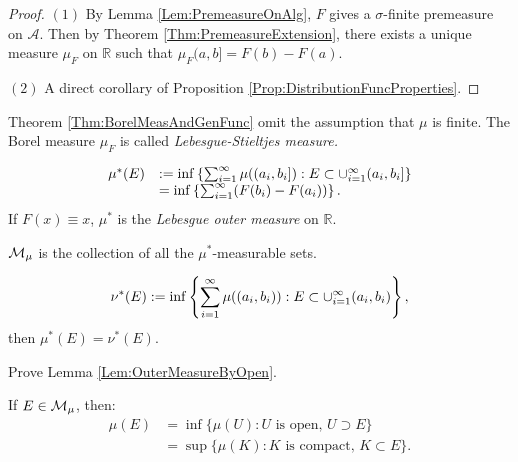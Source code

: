 \begin{proof}
    $(1)$ By Lemma \ref{Lem:PremeasureOnAlg}, $F$ gives a 
    $\sigma$-finite premeasure on $\mathcal{A}$. 
    Then by Theorem \ref{Thm:PremeasureExtension}, there exists a 
    unique measure $\mu_{F}$ on $\mathbb{R}$ such that 
    $\mu_{F}(a,b]=F(b)-F(a)$.

    $(2)$ A direct corollary of Proposition 
    \ref{Prop:DistributionFuncProperties}.
\end{proof}
\begin{rem}
    Theorem \ref{Thm:BorelMeasAndGenFunc} 
    omit the assumption that $\mu$ is finite. 
    The Borel measure $\mu_{F}$ is called 
    \textit{Lebesgue-Stieltjes measure.} 
\end{rem}
\begin{rem}
    \begin{displaymath}
        \begin{array}{rl}
            \mu^{*}(E)&:=\inf\left\{\sum_{i=1}^{\infty}\mu((a_i,b_i]):
            E\subset\cup_{i=1}^{\infty}(a_i,b_i]\right\}\\
            &=\inf\left\{\sum_{i=1}^{\infty}(F(b_i)-F(a_i))\right\}.\\
        \end{array}
    \end{displaymath}
    If $F(x)\equiv x$, $\mu^{*}$ is the \textit{Lebesgue 
    outer measure }on $\mathbb{R}$. 
\end{rem}
\begin{ntn}
    $\mathcal{M}_{\mu}$ is the collection of all the $\mu^{*}$-measurable 
    sets.
\end{ntn}
\begin{lem}
    \label{Lem:OuterMeasureByOpen}
    \begin{displaymath}
        \nu^{*}(E):=\inf\left\{\sum_{i=1}^{\infty}\mu((a_i,b_i)):
        E\subset\cup_{i=1}^{\infty}(a_i,b_i)\right\},
    \end{displaymath}
    then $\mu^{*}(E)=\nu^{*}(E)$.
\end{lem}
\begin{exc}
    Prove Lemma \ref{Lem:OuterMeasureByOpen}.
\end{exc}
\begin{thm}
    \label{Thm:ApproxMeasurableSet}
    If $E\in\mathcal{M}_{\mu}$, then:
    \begin{displaymath}
        \begin{array}{rl}
        \mu(E)&=\inf\{\mu(U):U\text{ is open, }U\supset E\}\\
        &=\sup\{\mu(K):K\text{ is compact, }K\subset E\}.
        \end{array}
    \end{displaymath}
\end{thm}
